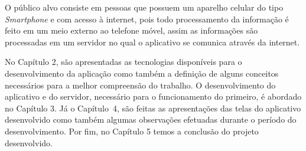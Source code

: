 
O público alvo consiste em pessoas que possuem um aparelho celular do tipo \textit{Smartphone} e com acesso à internet, pois todo processamento da informação é feito em um meio externo ao telefone móvel, assim as informações são processadas em um servidor no qual o aplicativo se comunica através da internet.

No Capítulo 2, são apresentadas as tecnologias disponíveis para o desenvolvimento da aplicação como também a definição de alguns conceitos necessários para a melhor compreensão do trabalho. O desenvolvimento do aplicativo e do servidor, necessário para o funcionamento do primeiro, é abordado no Capítulo 3. Já o Capítulo~4, são feitas as apresentações das telas do aplicativo desenvolvido como também algumas observações efetuadas durante o período do desenvolvimento. Por fim, no Capítulo 5 temos a conclusão do projeto desenvolvido.
